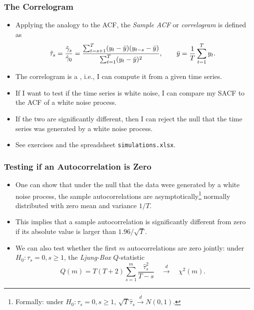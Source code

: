 \begin{frame}
\frametitle{The Correlogram}
\begin{itemize}
\item Applying the analogy to the ACF, the
\emph{\color{red}Sample ACF} or \emph{\color{red}correlogram} is defined as
\begin{equation*}
\hat{\tau}_{s }=\frac{\hat{\gamma}_{s }}{\hat{\gamma}_{0}}=\frac{%
\sum_{t=s +1}^{T}(y_{t}-\bar{y})(y_{t-s }-\bar{y})}{%
\sum_{t=1}^{T}(y_{t}-\bar{y})^{2}},\qquad \bar{y}=\frac{1}{T}%
\sum_{t=1}^{T}y_{t}.
\end{equation*}
\item The correlogram is a , i.e., I can compute it from a given time series.
\item If I want to test if the time series is white noise, I can compare my SACF to the ACF of a white noise process.
\item If the two are significantly different, then I can reject the null that the time series was generated by a white noise process.
\item See exercises and the spreadsheet \texttt{simulations.xlsx}.
\end{itemize}
\end{frame}
\begin{frame}
\frametitle{Testing if an Autocorrelation is Zero}
\begin{itemize}
\item One can show that under the null that the data were generated by a white noise process, the sample autocorrelations are asymptotically\footnote{Formally: under $H_{0}:\tau _{s }=0,s \geq 1$, $\sqrt{T}\hat{\tau}_s \overset{d}{\longrightarrow }N(0,1)$.} normally distributed with
zero mean and variance $1/T$.
\item This implies that a sample autocorrelation is significantly different from
zero if its absolute value is larger than $1.96 / \sqrt{T}$.

\item We can also test whether the first $m$ autocorrelations are zero jointly: under $H_{0}:\tau _{s }=0,s \geq 1$, the \emph{\color{red}Ljung-Box}  $Q$-statistic%
\begin{equation*}
Q(m)=T(T+2)\sum_{s =1}^{m}\frac{\hat{\tau}_{s }^{2}}{T-s }\quad
{\overset{d}{\longrightarrow }}\quad \chi ^{2}(m).
\end{equation*}%
\end{itemize}
\end{frame}%
